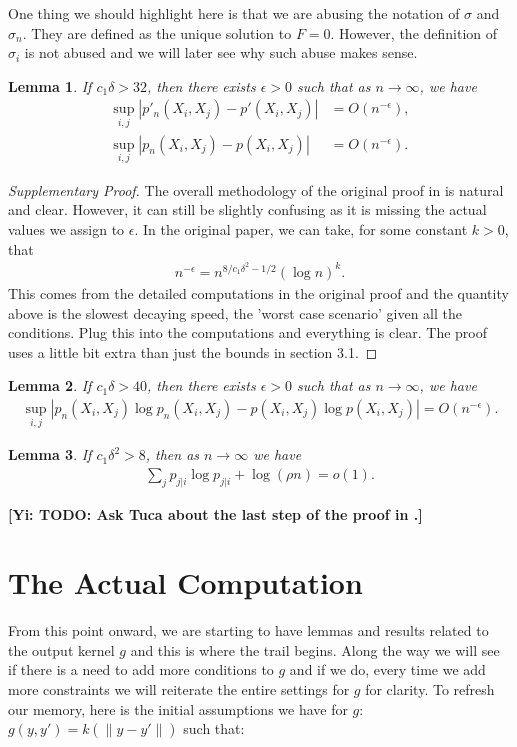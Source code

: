 \documentclass[10pt]{article}
\newcommand{\norm}[1]{\left\lVert#1\right\rVert}
\newcommand{\gy}[1]{\textbf{\color{red}[Yi: #1]}}
\newtheorem{lemma}{\bf Lemma}
\newenvironment{Proof of lemma}{\noindent{\bf Proof of Lemma}}{\hfill$\Box$\newline}
\newenvironment{Proof of claim}{\noindent{\bf Proof of claim}}{\hfill$\Box$\newline}
\newenvironment{Proof of theorem}{\noindent{\bf Proof of Theorem}}{\hfill\scriptsize{$\Box$}\newline}
\newenvironment{Proof of theorems}{\noindent{\bf Proof of Theorems}}{\hfill$\Box$\newline}
\newenvironment{Proof of proposition}{\noindent{\bf Proof of Proposition}}{\hfill$\Box$\newline}
\newenvironment{Proof of propositions}{\noindent{\bf Proof of Propositions}}{\hfill$\Box$\newline}
\newenvironment{Proof of exercise}{\noindent{\it Proof of Exercise:}}{\hfill$\Box$}
\numberwithin{equation}{section}
\begin{document}
One thing we should highlight here is that we are abusing the notation of $\sigma$ and $\sigma_n$. They are defined as the unique solution to $F=0$. However, the definition of $\sigma_i$ is not abused and we will later see why such abuse makes sense.
\begin{lemma} \label{integrand_lemma_2}
    If $c_1 \delta >32$, then there exists $\epsilon>0$ such that as $n \to \infty$, we have
    \begin{align}
        \sup_{i,j}|p'_n(X_i,X_j)-p'(X_i,X_j)| & = O(n^{-\epsilon}), \nonumber \\
        \sup_{i,j}|p_n(X_i,X_j)-p(X_i,X_j)|   & = O(n^{-\epsilon}).
    \end{align}
\end{lemma}
\begin{proof}[Supplementary Proof]
    The overall methodology of the original proof in \cite{auffinger-tsne} is natural and clear. However, it can still be slightly confusing as it is missing the actual values we assign to $\epsilon$. In the original paper, we can take, for some constant $k>0$, that
    \begin{align}
        n^{-\epsilon} = n^{8/c_1\delta^2 -1/2} (\log n)^k.
    \end{align}
    This comes from the detailed computations in the original proof and the quantity above is the slowest decaying speed, the 'worst case scenario' given all the conditions. Plug this into the computations and everything is clear. The proof uses a little bit extra than just the bounds in section 3.1.
\end{proof}
\begin{lemma} \label{integrand_lemma}
    If $c_1\delta>40$, then there exists $\epsilon>0$ such that as $n \to \infty$, we have
    \begin{align}
        \sup_{i,j}|p_n(X_i,X_j)\log p_n(X_i,X_j) - p(X_i,X_j)\log p(X_i,X_j)| = O(n^{-\epsilon}).
    \end{align}
\end{lemma}
\begin{lemma}
    If $c_1\delta^2>8$, then as $n \to \infty$ we have
    \begin{align}
        \sum_j p_{j|i} \log p_{j|i} + \log (\rho n) = o(1).
    \end{align}
\end{lemma}
\gy{TODO: Ask Tuca about the last step of the proof in \cite{auffinger-tsne}.}
\section{The Actual Computation} \label{section_actual_computation}
From this point onward, we are starting to have lemmas and results related to
the output kernel $g$ and this is where the trail begins. Along the way we will
see if there is a need to add more conditions to $g$ and if we do, every time
we add more constraints we will reiterate the entire settings for $g$ for
clarity. To refresh our memory, here is the initial assumptions we have for
$g$: $g(y,y') = k (\norm{y-y'})$ such that:
\end{document}
